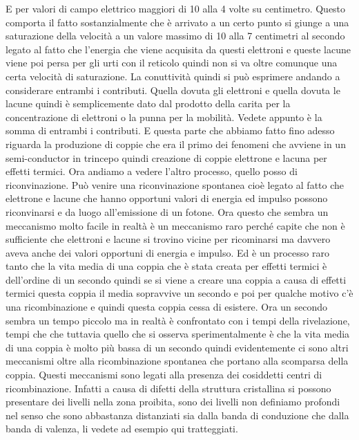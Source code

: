 {E per valori di campo elettrico maggiori di 10 alla 4 volte su centimetro. Questo comporta il fatto sostanzialmente che è arrivato a un certo punto si giunge a una saturazione della velocità a un valore massimo di 10 alla 7 centimetri al secondo legato al fatto che l'energia che viene acquisita da questi elettroni e queste lacune viene poi persa per gli urti con il reticolo quindi non si va oltre comunque una certa velocità di saturazione. La conuttività quindi si può esprimere andando a considerare entrambi i contributi. Quella dovuta gli elettroni e quella dovuta le lacune quindi è semplicemente dato dal prodotto della carita per la concentrazione di elettroni o la punna per la mobilità. Vedete appunto è la somma di entrambi i contributi. E questa parte che abbiamo fatto fino adesso riguarda la produzione di coppie che era il primo dei fenomeni che avviene in un semi-conductor in trincepo quindi creazione di coppie elettrone e lacuna per effetti termici. Ora andiamo a vedere l'altro processo, quello posso di riconvinazione. Può venire una riconvinazione spontanea cioè legato al fatto che elettrone e lacune che hanno opportuni valori di energia ed impulso possono riconvinarsi e da luogo all'emissione di un fotone. Ora questo che sembra un meccanismo molto facile in realtà è un meccanismo raro perché capite che non è sufficiente che elettroni e lacune si trovino vicine per ricominarsi ma davvero aveva anche dei valori opportuni di energia e impulso. Ed è un processo raro tanto che la vita media di una coppia che è stata creata per effetti termici è dell'ordine di un secondo quindi se si viene a creare una coppia a causa di effetti termici questa coppia il media sopravvive un secondo e poi per qualche motivo c'è una ricombinazione e quindi questa coppia cessa di esistere. Ora un secondo sembra un tempo piccolo ma in realtà è confrontato con i tempi della rivelazione, tempi che che tuttavia quello che si osserva sperimentalmente è che la vita media di una coppia è molto più bassa di un secondo quindi evidentemente ci sono altri meccanismi oltre alla ricombinazione spontanea che portano alla scomparsa della coppia. Questi meccanismi sono legati alla presenza dei cosiddetti centri di ricombinazione. Infatti a causa di difetti della struttura cristallina si possono presentare dei livelli nella zona proibita, sono dei livelli non definiamo profondi nel senso che sono abbastanza distanziati sia dalla banda di conduzione che dalla banda di valenza, li vedete ad esempio qui tratteggiati.

}
